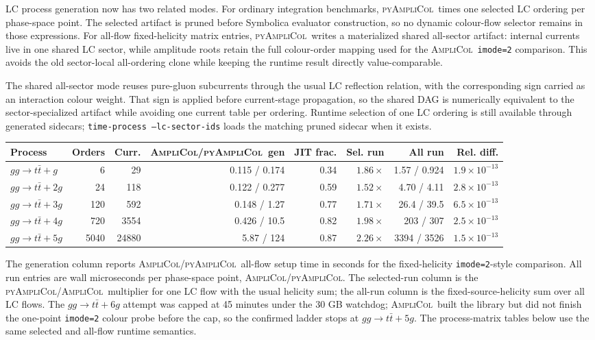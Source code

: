 \documentclass[10pt]{article}
\newcommand{\AC}{\textsc{AmpliCol}}
\newcommand{\PAC}{\textsc{pyAmpliCol}}
\begin{document}
LC process generation now has two related modes.  For ordinary integration
benchmarks, \PAC\ times one selected LC ordering per phase-space point.  The
selected artifact is pruned before Symbolica evaluator construction, so no
dynamic colour-flow selector remains in those expressions.  For all-flow
fixed-helicity matrix entries, \PAC\ writes a materialized shared all-sector
artifact: internal currents live in one shared LC sector, while amplitude roots
retain the full colour-order mapping used for the \AC\ \texttt{imode=2}
comparison.  This avoids the old sector-local all-ordering clone while keeping
the runtime result directly value-comparable.

The shared all-sector mode reuses pure-gluon subcurrents through the usual LC
reflection relation, with the corresponding sign carried as an interaction
colour weight.  That sign is applied before current-stage propagation, so the
shared DAG is numerically equivalent to the sector-specialized artifact while
avoiding one current table per ordering.  Runtime selection of one LC ordering
is still available through generated sidecars; \texttt{time-process
--lc-sector-ids} loads the matching pruned sidecar when it exists.

\begin{center}
\begingroup
\scriptsize
\setlength{\tabcolsep}{3pt}
\begin{tabular}{@{}L{1.2in}rrrrrrr@{}}
\toprule
Process & Orders & Curr. & \AC/\PAC\ gen & JIT frac. & Sel. run & All run & Rel. diff. \\
\midrule
\(gg\to t\bar t+g\) & 6 & 29 & 0.115 / 0.174 & 0.34 & \(1.86\times\) & 1.57 / 0.924 & \(1.9\times10^{-13}\) \\
\(gg\to t\bar t+2g\) & 24 & 118 & 0.122 / 0.277 & 0.59 & \(1.52\times\) & 4.70 / 4.11 & \(2.8\times10^{-13}\) \\
\(gg\to t\bar t+3g\) & 120 & 592 & 0.148 / 1.27 & 0.77 & \(1.71\times\) & 26.4 / 39.5 & \(6.5\times10^{-13}\) \\
\(gg\to t\bar t+4g\) & 720 & 3554 & 0.426 / 10.5 & 0.82 & \(1.98\times\) & 203 / 307 & \(2.5\times10^{-13}\) \\
\(gg\to t\bar t+5g\) & 5040 & 24880 & 5.87 / 124 & 0.87 & \(2.26\times\) & 3394 / 3526 & \(1.5\times10^{-13}\) \\
\bottomrule
\end{tabular}
\endgroup
\end{center}

\noindent\footnotesize The generation column reports \AC/\PAC\ all-flow setup
time in seconds for the fixed-helicity \texttt{imode=2}-style comparison.  All
run entries are wall microseconds per phase-space point, \AC/\PAC.  The
selected-run column is the \PAC/\AC\ multiplier for one LC flow with the usual
helicity sum; the all-run column is the fixed-source-helicity sum over all LC
flows.  The \(gg\to t\bar t+6g\) attempt was capped at 45 minutes under the
30 GB watchdog; \AC\ built the library but did not finish the one-point
\texttt{imode=2} colour probe before the cap, so the confirmed ladder stops at
\(gg\to t\bar t+5g\).  The process-matrix tables below use the same selected
and all-flow runtime semantics.
\end{document}
